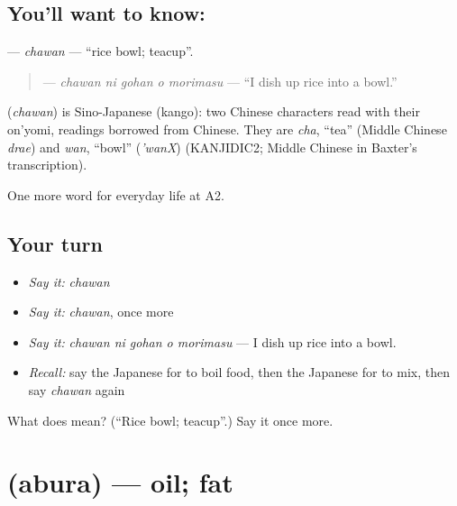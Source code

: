 \subsection*{You'll want to know: }
\textbf{} — \emph{chawan} — \textquotedblleft{}rice bowl; teacup\textquotedblright{}.

\begin{quote}
\textbf{  } — \emph{chawan ni gohan o morimasu} — \textquotedblleft{}I dish up rice into a bowl.\textquotedblright{}
\end{quote}

\begin{cousinweb}
\textbf{} (\emph{chawan}) is Sino-Japanese (kango): two Chinese characters read with their on'yomi, readings borrowed from Chinese. They are \emph{cha}, \textquotedblleft{}tea\textquotedblright{} (Middle Chinese \emph{drae}) and \emph{wan}, \textquotedblleft{}bowl\textquotedblright{} (\emph{'wanX}) (KANJIDIC2; Middle Chinese in Baxter's transcription).
\end{cousinweb}

\begin{grammarlens}[title={What you've built}]
One more word for everyday life at A2.
\end{grammarlens}

\subsection*{Your turn}
\begin{itemize}
\raggedright
  \item \emph{Say it:} \emph{chawan}
  \item \emph{Say it:} \emph{chawan}, once more
  \item \emph{Say it:} \emph{chawan ni gohan o morimasu} — I dish up rice into a bowl.
  \item \emph{Recall:} say the Japanese for to boil food, then the Japanese for to mix, then say \emph{chawan} again
\end{itemize}

\begin{tcolorbox}[breakable,colback=teal!4,colframe=teal!35!black,title={Before you move on}]
What does  mean? (\textquotedblleft{}Rice bowl; teacup\textquotedblright{}.) Say it once more.
\end{tcolorbox}
\section[\texorpdfstring{\ja{あぶら} (abura)}{あぶら (abura)}]{ (abura) — oil; fat}

